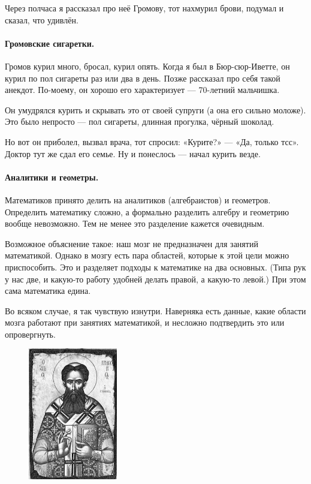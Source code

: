 \documentclass{book}
\begin{document}
Через полчаса я рассказал про неё Громову, тот нахмурил брови, подумал и сказал, что удивлён.

\paragraph{Громовские сигаретки.}
Громов курил много, бросал, курил опять.
Когда я был в Бюр-сюр-Иветте, он курил по пол сигареты раз или два в день.
Позже рассказал про себя такой анекдот.
По-моему, он хорошо его характеризует --- 70-летний мальчишка.

Он умудрялся курить и скрывать это от своей супруги (а она его сильно моложе).
Это было непросто --- пол сигареты, длинная прогулка, чёрный шоколад.

Но вот он приболел, вызвал врача, тот спросил: «Курите?» --- «Да, только тсс».
Доктор тут же сдал его семье.
Ну и понеслось --- начал курить везде.

\paragraph{Аналитики и геометры.}
Математиков принято делить на аналитиков (алгебраистов) и геометров.
Определить математику сложно, а формально разделить алгебру и геометрию вообще невозможно.
Тем не менее это разделение кажется очевидным.

Возможное объяснение такое:
наш мозг не предназначен для занятий математикой.
Однако в мозгу есть пара областей, которые к этой цели можно приспособить.
Это и разделяет подходы к математике на два основных.
(Типа рук у нас две, и какую-то работу удобней делать правой, а какую-то левой.)
При этом сама математика едина.

Во всяком случае, я так чувствую изнутри.
Наверняка есть данные, какие области мозга работают при занятиях математикой,
и несложно подтвердить это или опровергнуть.

\begin{figure}
\vskip-8mm
\centering
\includegraphics[width=39mm,angle=0]{pics/palama}
\end{figure}
\end{document}
